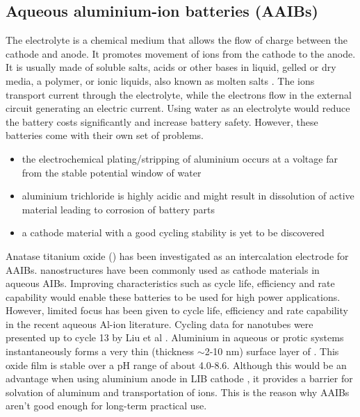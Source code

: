 \subsection{Aqueous aluminium-ion batteries (AAIBs)}
The electrolyte is a chemical medium that allows the flow of charge between the cathode and anode. It promotes movement of ions from the cathode to the anode. It is usually made of soluble salts, acids or other bases in liquid, gelled or dry media, a polymer, or ionic liquids, also known as molten salts \cite{xu_nonaqueous, armand_ionic,croce_nanocom}. The ions transport current through the electrolyte, while the electrons flow in the external circuit generating an electric current. Using water as an electrolyte would reduce the battery costs significantly and increase battery safety. However, these batteries come with their own set of problems. 

\begin{itemize}
    \item the electrochemical plating/stripping of aluminium occurs at a voltage far from the stable potential window of water
    \item aluminium trichloride  is highly acidic and might result in dissolution of active material leading to corrosion of battery parts
    \item a cathode material with a good cycling stability is yet to be discovered
\end{itemize}  

Anatase titanium oxide () has been investigated as an intercalation electrode for AAIBs.  nanostructures have been commonly used as cathode materials in aqueous AIBs. Improving characteristics such as cycle life, efficiency and rate capability would enable these batteries to be used for high power applications. However, limited focus has been given to cycle life, efficiency and rate capability in the recent aqueous Al-ion literature. Cycling data for  nanotubes were presented up to cycle 13 by Liu et al \cite{liu_aluminum_2012}.  %
Aluminium in aqueous or protic systems instantaneously forms a very thin (thickness $\sim$2-10 nm) surface layer of  \cite{vargel_translated_2004}. This oxide film is stable over a pH range of about 4.0-8.6. Although this would be an advantage when using aluminium anode in LIB cathode \cite{myung_electrochemical_2011}, it provides a barrier for solvation of aluminum and transportation of  ions. This is the reason why AAIBs aren't good enough for long-term practical use.

